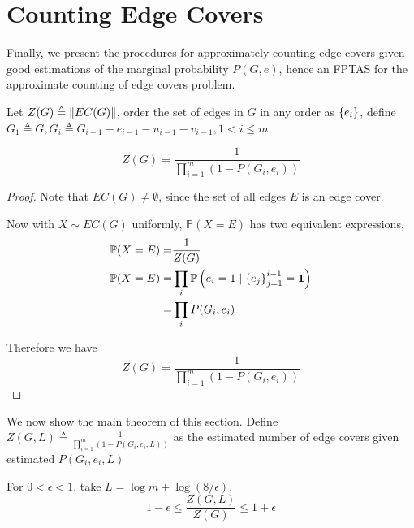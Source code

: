 \section{Counting Edge Covers}

Finally, we present the procedures for approximately counting edge covers given good estimations of the marginal probability $P(G,e)$, hence an FPTAS for the approximate counting of edge covers problem.

\begin{Prop}
	
	Let $Z(G) \triangleq \left\Vert EC(G)\right\Vert$, order the set of edges in $G$ in any order as $\left\{e_i\right\}$, define $G_1 \triangleq G, G_i \triangleq G_{i-1} - e_{i-1} - u_{i-1} - v_{i-1}, 1 < i \leq m $.

	\[ Z(G) = \frac{1}{\prod_{i=1}^m (1 - P(G_i, e_i))} \]

\end{Prop}

\begin{proof}
	Note that $EC(G) \neq \emptyset$, since the set of all edges $E$ is an edge cover.

	Now with $X \sim EC(G)$ uniformly, $\mathbb{P}(X=E)$ has two equivalent expressions,
	\begin{align*}
		\mathbb{P} (X = E) =& \frac{1}{Z(G)} \\
		\mathbb{P} (X = E) =& \prod_i \mathbb{P} \left(e_i = 1 \mid \left\{e_j\right\}_{j=1}^{i-1} = \mathbf{1} \right) \\
		=&\prod_i P(G_i, e_i)
	\end{align*}

	Therefore we have 
	\[ Z(G) = \frac{1}{\prod_{i=1}^m (1 - P(G_i, e_i))} \]
\end{proof}

We now show the main theorem of this section.
Define $Z(G, L) \triangleq \frac{1}{\prod_{i=1}^m (1 - P(G_i, e_i, L))}$ as the estimated number of edge covers given estimated $P(G_i, e_i, L)$

\begin{Thm}
	For $0< \epsilon <1$, take $L=\log m + \log(8/ \epsilon) $, 
	\[ 1- \epsilon \leq \frac{Z(G, L)}{Z(G)} \leq 1+ \epsilon\]
\end{Thm}

